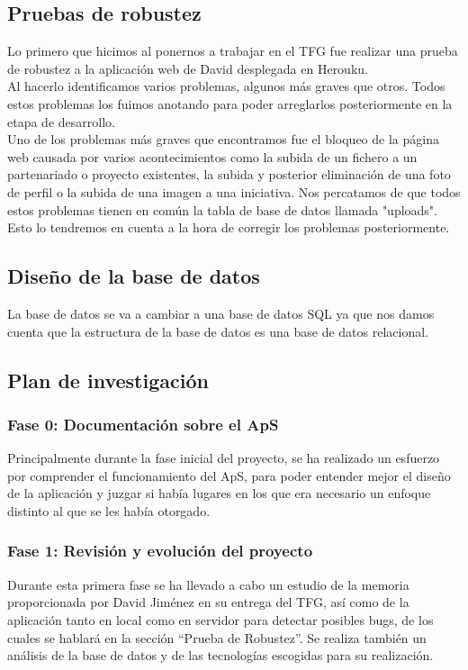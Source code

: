 \documentclass{article}
\begin{document}
\subsection{Pruebas de robustez}
Lo primero que hicimos al ponernos a trabajar en el TFG fue realizar una prueba de robustez a la aplicación web de David desplegada en Herouku.\\
Al hacerlo identificamos varios problemas, algunos más graves que otros. Todos estos problemas los fuimos anotando para poder arreglarlos posteriormente en la etapa de desarrollo.\\
Uno de los problemas más graves que encontramos fue el bloqueo de la página web causada por varios acontecimientos como la subida de un fichero a un partenariado o proyecto existentes, la subida y posterior eliminación de una foto de perfil o la subida de una imagen a una iniciativa. Nos percatamos de que todos estos problemas tienen en común la tabla de base de datos llamada "uploads". Esto lo tendremos en cuenta a la hora de corregir los problemas 
posteriormente.

\subsection{Diseño de la base de datos}
La base de datos se va a cambiar a una base de datos SQL ya que nos damos cuenta que la estructura de la base de datos es una base de datos relacional.

\subsection{Plan de investigación}
\subsubsection{Fase 0: Documentación sobre el ApS}
Principalmente durante la fase inicial del proyecto, se ha realizado un esfuerzo por comprender el funcionamiento del ApS, para poder entender mejor el diseño de la aplicación y juzgar si había lugares en los que era necesario un enfoque distinto al que se les había otorgado. 
\subsubsection{Fase 1: Revisión y evolución del proyecto}
Durante esta primera fase se ha llevado a cabo un estudio de la memoria proporcionada por David Jiménez en su entrega del TFG, así como de la aplicación tanto en local como en servidor para detectar posibles bugs, de los cuales se hablará en la sección ``Prueba de Robustez''.
Se realiza también un análisis de la base de datos y de las tecnologías escogidas para su realización.
\end{document}
